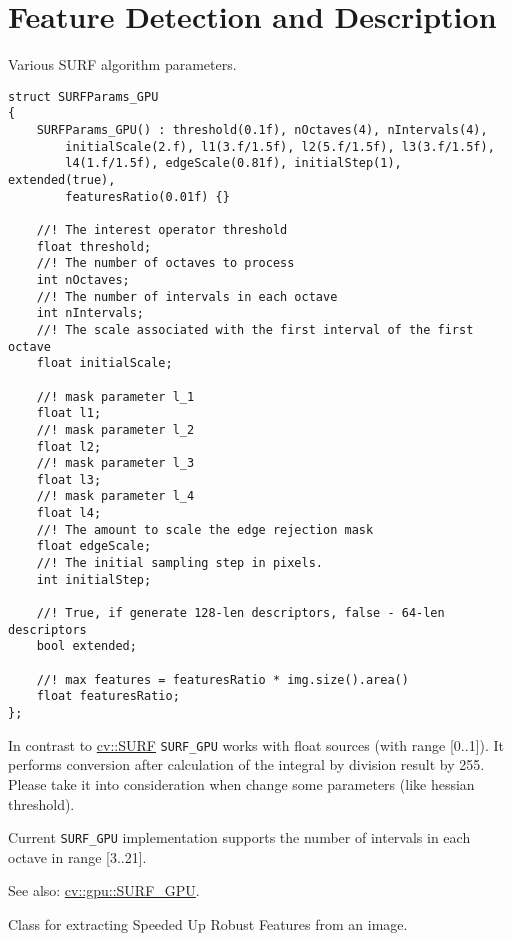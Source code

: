 \section{Feature Detection and Description}


\label{class.gpu.SURFParams}
Various SURF algorithm parameters.

\begin{lstlisting}
struct SURFParams_GPU 
{
    SURFParams_GPU() : threshold(0.1f), nOctaves(4), nIntervals(4), 
        initialScale(2.f), l1(3.f/1.5f), l2(5.f/1.5f), l3(3.f/1.5f), 
        l4(1.f/1.5f), edgeScale(0.81f), initialStep(1), extended(true), 
        featuresRatio(0.01f) {}

    //! The interest operator threshold
    float threshold;
    //! The number of octaves to process
    int nOctaves;
    //! The number of intervals in each octave
    int nIntervals;
    //! The scale associated with the first interval of the first octave
    float initialScale;

    //! mask parameter l_1
    float l1;
    //! mask parameter l_2 
    float l2;
    //! mask parameter l_3
    float l3;
    //! mask parameter l_4
    float l4;
    //! The amount to scale the edge rejection mask
    float edgeScale;
    //! The initial sampling step in pixels.
    int initialStep;

    //! True, if generate 128-len descriptors, false - 64-len descriptors
    bool extended;

    //! max features = featuresRatio * img.size().area()
    float featuresRatio;
};
\end{lstlisting}

In contrast to \hyperref[cv.class.SURF]{cv::SURF} \texttt{SURF\_GPU} works with float sources (with range [0..1]). It performs conversion after calculation of the integral by division result by 255. Please take it into consideration when change some parameters (like hessian threshold).

Current \texttt{SURF\_GPU} implementation supports the number of intervals in each octave in range [3..21].

See also: \hyperref[class.gpu.SURF]{cv::gpu::SURF\_GPU}.


\label{class.gpu.SURF}
Class for extracting Speeded Up Robust Features from an image.

